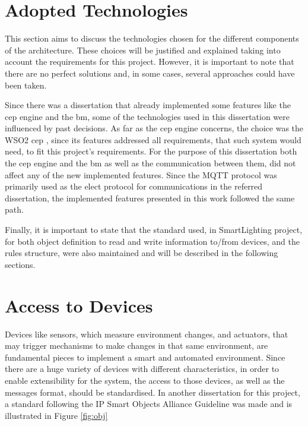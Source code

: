 \section{Adopted  Technologies}
\label{implementation:technologies}

This section aims to discuss the technologies chosen for the different components of the architecture. These choices will be justified and explained taking into account the requirements for this project. However, it is important to note that there are no perfect solutions and, in some cases, several approaches could have been taken. 

Since there was a dissertation\cite{helder} that already implemented some features like the \ac{cep} engine and the \ac{bm}, some of the technologies used in this dissertation were influenced by past decisions. As far as the \ac{cep} engine concerns, the choice was the WSO2 \ac{cep} \cite{wso2}, since its features addressed all requirements, that such system would need, to fit this project's requirements. For the purpose of this dissertation both the \ac{cep} engine and the \ac{bm} as well as the communication between them, did not affect any of the new implemented features. Since the MQTT protocol was primarily used as the elect protocol for communications in the referred dissertation, the implemented features presented in this work followed the same path.

Finally, it is important to state that the standard used, in SmartLighting project, for both object definition to read and write information to/from devices, and the rules structure, were also maintained and will be described in the following sections. 

\section{Access to Devices}
\label{implementation:devices}

Devices like sensors, which measure environment changes, and actuators, that may trigger mechanisms to make changes in that same environment, are fundamental pieces to implement a smart and automated environment. Since there are a huge variety of devices with different characteristics, in order to enable extensibility for the system, the access to those devices, as well as the messages format, should be standardised. In another dissertation for this project, a standard following the IP Smart Objects Alliance Guideline\cite{IPSOAlliance2014} was made and is illustrated in Figure \ref{fig:obj}


